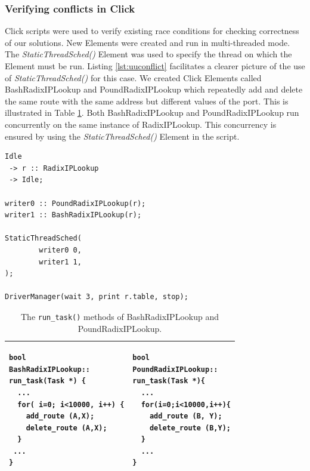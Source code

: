 \documentclass[a4paper,marginparwidth=50pt,marginparsep=10pt]{article}
\begin{document}
\subsubsection{Verifying conflicts in Click}
 Click scripts were used to verify existing race conditions for checking correctness of our solutions. New Elements were created and run in multi-threaded mode. The \emph{StaticThreadSched()} Element was used to specify the thread on which the Element must be run. Listing \ref{lst:uuconflict} facilitates a clearer picture of the use of \emph{StaticThreadSched()} for this case. We created Click Elements called BashRadixIPLookup and PoundRadixIPLookup which repeatedly add and delete the same route with the same address but different values of the port. This is illustrated in Table \ref{tbl:uuverify}. Both BashRadixIPLookup and PoundRadixIPLookup run concurrently on the same instance of RadixIPLookup. This concurrency is ensured by using the \emph{StaticThreadSched()} Element in the script.
\begin{lstlisting}[float=tph, caption=Click script for verifying updater-updater conflicts.,label=lst:uuconflict]
Idle
 -> r :: RadixIPLookup
 -> Idle;

writer0 :: PoundRadixIPLookup(r);
writer1 :: BashRadixIPLookup(r);

StaticThreadSched(
        writer0 0,
        writer1 1,
);

DriverManager(wait 3, print r.table, stop);

\end{lstlisting}
\begin{table}
\begin{center}
\begin{tabular}{|p{2.2in}|p{2.2in}|}
\hline
\begin{lstlisting}[label=lst:uubashradixiplookup]
bool
BashRadixIPLookup::
run_task(Task *) {
  ...
  for( i=0; i<10000, i++) {
    add_route (A,X);
    delete_route (A,X);
  }
 ...
}
\end{lstlisting}
&
\begin{lstlisting}[label=lst:uupoundradixiplookup]
bool
PoundRadixIPLookup::
run_task(Task *){
  ...
  for(i=0;i<10000,i++){
    add_route (B, Y);
    delete_route (B,Y);
  }
  ...
}
\end{lstlisting}\\
\hline
\end{tabular}
\end{center}
\caption{The \texttt{run\_task()} methods of BashRadixIPLookup and PoundRadixIPLookup.}
\label{tbl:uuverify}
\end{table}
\end{document}
